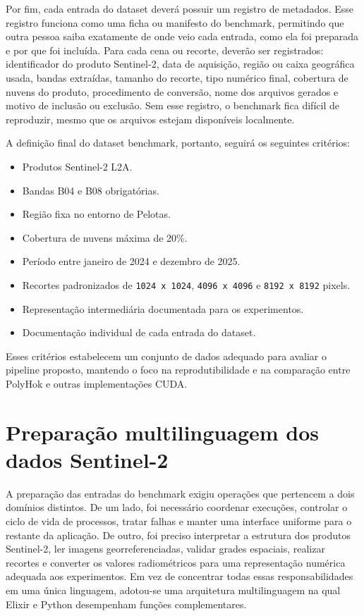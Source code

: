 \documentclass[tcc,capa]{texufpel}
\begin{document}
Por fim, cada entrada do dataset deverá possuir um registro de metadados. Esse registro funciona como uma ficha ou manifesto do benchmark, permitindo que outra pessoa saiba exatamente de onde veio cada entrada, como ela foi preparada e por que foi incluída. Para cada cena ou recorte, deverão ser registrados: identificador do produto Sentinel-2, data de aquisição, região ou caixa geográfica usada, bandas extraídas, tamanho do recorte, tipo numérico final, cobertura de nuvens do produto, procedimento de conversão, nome dos arquivos gerados e motivo de inclusão ou exclusão. Sem esse registro, o benchmark fica difícil de reproduzir, mesmo que os arquivos estejam disponíveis localmente.

A definição final do dataset benchmark, portanto, seguirá os seguintes critérios:

\begin{itemize}
  \item Produtos Sentinel-2 L2A.
  \item Bandas B04 e B08 obrigatórias.
  \item Região fixa no entorno de Pelotas.
  \item Cobertura de nuvens máxima de 20\%.
  \item Período entre janeiro de 2024 e dezembro de 2025.
  \item Recortes padronizados de \texttt{1024 x 1024}, \texttt{4096 x 4096} e \texttt{8192 x 8192} pixels.
  \item Representação intermediária documentada para os experimentos.
  \item Documentação individual de cada entrada do dataset.
\end{itemize}

Esses critérios estabelecem um conjunto de dados adequado para avaliar o pipeline proposto, mantendo o foco na reprodutibilidade e na comparação entre PolyHok e outras implementações CUDA.

\section{Preparação multilinguagem dos dados Sentinel-2}
\label{sec:preparacao-multilinguagem}

A preparação das entradas do benchmark exigiu operações que pertencem a dois
domínios distintos. De um lado, foi necessário coordenar execuções, controlar o
ciclo de vida de processos, tratar falhas e manter uma interface uniforme para o
restante da aplicação. De outro, foi preciso interpretar a estrutura dos produtos
Sentinel-2, ler imagens georreferenciadas, validar grades espaciais, realizar
recortes e converter os valores radiométricos para uma representação numérica
adequada aos experimentos. Em vez de concentrar todas essas responsabilidades em
uma única linguagem, adotou-se uma arquitetura multilinguagem na qual Elixir e
Python desempenham funções complementares.
\end{document}
